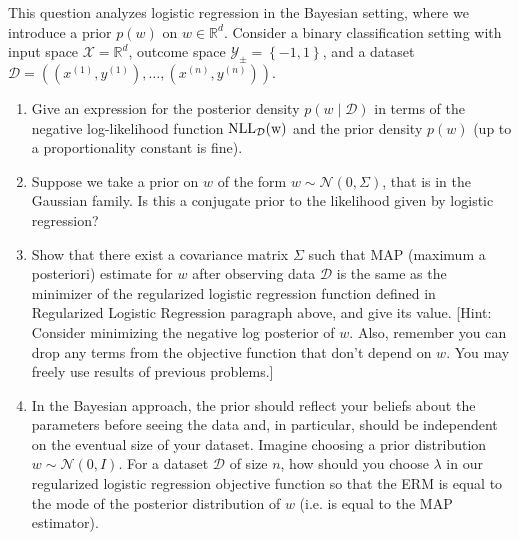 \documentclass{article}
\newcommand{\nll}{\rm NLL}
\theoremstyle{plain}
\theoremstyle{definition}
\begin{document}
This question analyzes logistic regression in the Bayesian setting, where we introduce a prior $p(w)$ on  $w\in\mathbb{R}^{d}$. Consider a binary classification setting with input
space $\mathcal{X}=\mathbb{R}^{d}$, outcome space $\mathcal{Y}_{\pm}=\left\{ -1,1\right\} $,
and a dataset $\mathcal{D}=\left((x^{(1)},y^{(1)}),\ldots,(x^{(n)},y^{(n)})\right)$.
\begin{enumerate}
  \setcounter{enumi}{\value{saveenum}}
\item Give an expression for the posterior density $p(w\mid\mathcal{D})$ in terms
of the negative log-likelihood function $\nll_{\mathcal{D}}(w)$ and the prior density $p(w)$
(up to a proportionality constant is fine).
\begin{itemize}
  \color{blue}
\end{itemize} 

\item Suppose we take a prior on $w$ of the form $w\sim\mathcal{N}(0,\Sigma)$, that is in the Gaussian family. Is this a conjugate prior to the likelihood given by logistic regression?


\item Show that there exist a covariance matrix $\Sigma$ such that MAP (maximum a posteriori) estimate for $w$
after observing data $\mathcal{D}$ is the same as the minimizer of the regularized
logistic regression function defined in Regularized Logistic Regression paragraph above, and give its value. {[}Hint: Consider minimizing the negative log posterior
of $w$. Also, remember you can drop any terms from the objective
function that don't depend on $w$. You may freely use results
of previous problems.{]} 


\item In the Bayesian approach, the prior should reflect your beliefs about
the parameters before seeing the data and, in particular, should be
independent on the eventual size of your dataset. Imagine choosing a prior distribution $w\sim\mathcal{N}(0,I)$. For a dataset $\mathcal{D}$
of size $n$, how should you choose $\lambda$ in our regularized
logistic regression objective function so that the ERM is equal
to the mode of the posterior distribution of $w$ (i.e. is equal to
the MAP estimator). 



\setcounter{saveenum}{\value{enumi}}
\end{enumerate}
\end{document}
